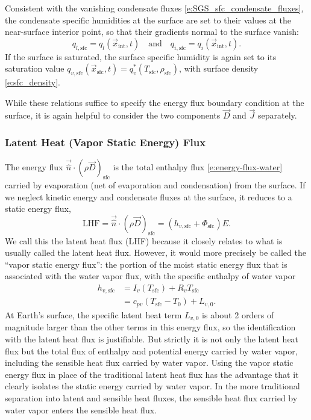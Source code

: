 \documentclass{report}
\begin{document}
\begin{enumerate}
    Consistent with the vanishing condensate fluxes \eqref{e:SGS_sfc_condensate_fluxes}, the condensate specific humidities at the surface are set to their values at the near-surface interior point, so that their gradients normal to the surface vanish:
    \[
    q_{l, \mathrm{sfc}} = q_l(\vec{x}_\mathrm{int}, t) \quad \text{and} \quad q_{i, \mathrm{sfc}} = q_i(\vec{x}_\mathrm{int}, t).
    \]
    If the surface is saturated, the surface specific humidity is again set to its saturation value $q_{v, \mathrm{sfc}}(\vec{x}_\mathrm{sfc}, t) =q_v^*(T_\mathrm{sfc}, \rho_\mathrm{sfc})$, with surface density \eqref{e:sfc_density}.
\end{enumerate}
While these relations suffice to specify the energy flux boundary condition at the surface, it is again helpful to consider the two components $\vec{D}$ and $\vec{J}$ separately. 

\subsubsection{Latent Heat (Vapor Static Energy) Flux}

The energy flux $\vec{\hat n} \cdot (\rho \vec{D})_{\mathrm{sfc}}$ is the total enthalpy flux \eqref{e:energy-flux-water} carried by evaporation (net of evaporation and condensation) from the surface. If we neglect kinetic energy and condensate fluxes at the surface, it reduces to a static energy flux,
\begin{equation}\label{e:sfc_LHF}
     \mathrm{LHF} = \vec{\hat n} \cdot (\rho \vec{D})_{\mathrm{sfc}}   = (h_{v, \mathrm{sfc}} + \Phi_\mathrm{sfc}) E.
\end{equation}
We call this the latent heat flux (LHF) because it closely relates to what is usually called the latent heat flux. However, it would more precisely be called the ``vapor static energy flux'': the portion of the moist static energy flux that is associated with the water vapor flux, with the specific enthalpy of water vapor
\begin{equation}
\begin{split}
h_{v, \mathrm{sfc}} &=  I_{v}(T_\mathrm{sfc}) + R_v T_{\mathrm{sfc}} \\
&=  c_{pv} (T_\mathrm{sfc}-T_0) + L_{v,0}.
\end{split}
\end{equation}
At Earth's surface, the specific latent heat term $L_{v,0}$ is about 2 orders of magnitude larger than the other terms in this energy flux, so the identification with the latent heat flux is justifiable. But strictly it is not only the latent heat flux but the total flux of enthalpy and potential energy carried by water vapor, including the sensible heat flux carried by water vapor. Using the vapor static energy flux in place of the traditional latent heat flux has the advantage that it clearly isolates the static energy carried by water vapor. In the more traditional separation into latent and sensible heat fluxes, the sensible heat flux carried by water vapor enters the sensible heat flux.
\end{document}
